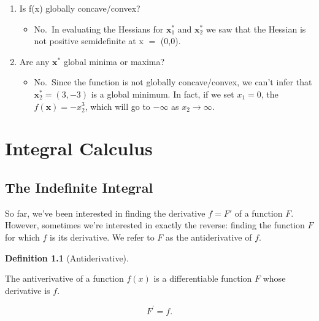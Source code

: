 \documentclass[
  letterpaper,
]{book}
\providecommand{\tightlist}{%
  \setlength{\itemsep}{0pt}\setlength{\parskip}{0pt}}\usepackage{longtable,booktabs,array}
\theoremstyle{definition}
\newtheorem{definition}{Definition}[chapter]
\theoremstyle{definition}
\theoremstyle{plain}
\theoremstyle{definition}
\theoremstyle{plain}
\theoremstyle{plain}
\theoremstyle{remark}
\begin{document}
\begin{enumerate}
  \begin{enumerate}
  \def\labelenumii{(\arabic{enumii})}
  \tightlist
  \item
    Is f(x) globally concave/convex?

    \begin{itemize}
    \tightlist
    \item
      No.~In evaluating the Hessians for \(\mathbf{x}_1^*\) and
      \(\mathbf{x}_2^*\) we saw that the Hessian is not positive
      semidefinite at x \(=\) (0,0).
    \end{itemize}
  \item
    Are any \(\mathbf{x^*}\) global minima or maxima?

    \begin{itemize}
    \tightlist
    \item
      No.~Since the function is not globally concave/convex, we can't
      infer that \(\mathbf{x}_2^*=(3,-3)\) is a global minimum. In fact,
      if we set \(x_1=0\), the \(f(\mathbf{x})=-x_2^3\), which will go
      to \(-\infty\) as \(x_2\to \infty\).
    \end{itemize}
  \end{enumerate}
\end{enumerate}

\hypertarget{integrals}{%
\chapter{Integral Calculus}\label{integrals}}

\hypertarget{the-indefinite-integral}{%
\section{The Indefinite Integral}\label{the-indefinite-integral}}

So far, we've been interested in finding the derivative \(f=F'\) of a
function \(F\). However, sometimes we're interested in exactly the
reverse: finding the function \(F\) for which \(f\) is its derivative.
We refer to \(F\) as the antiderivative of \(f\).

\leavevmode{}%
\begin{definition}[Antiderivative]\label{def-}

The antiverivative of a function \(f(x)\) is a differentiable function
\(F\) whose derivative is \(f\).

\[F^\prime = f.\]

\end{definition}
\end{document}
